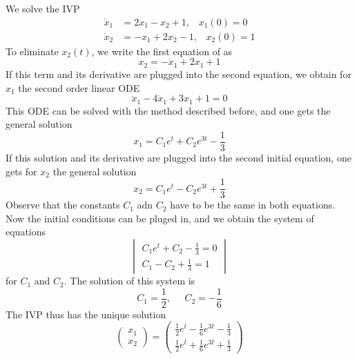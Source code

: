 We solve the IVP
\begin{equation}
  \begin{split}
    \dot{x}_1 &= 2x_1 - x_2 + 1, \;\;\; x_1(0) = 0\\
    \dot{x}_2 &= -x_1 + 2x_2 - 1, \;\;\; x_2(0) = 1
  \end{split}
\end{equation}
To eliminate $x_2(t)$, we write the first equation of as
\begin{equation}
  x_2 = -\dot{x}_1 + 2x_1 + 1
\end{equation}
If this term and its derivative are plugged into the second equation, we obtain for $x_1$ the second order linear ODE
\begin{equation}
  \ddot{x}_1 -4\dot{x}_1 + 3x_1 + 1 = 0
\end{equation}
This ODE can be solved with the method described before, and one gets the general solution
\begin{equation}
  x_1 = C_1 e^t + C_2 e^{3t} - \frac{1}{3}
\end{equation}
If this solution and its derivative are plugged into the second initial equation, one gets for $x_2$ the general solution
\begin{equation}
  x_2 = C_1 e^t - C_2 e^{3t} + \frac{1}{3}
\end{equation}
Observe that the constants $C_1$ adn $C_2$ have to be the same in both equations. Now the initial conditions can be pluged in, and we obtain the system of equations
\begin{equation}
  \begin{vmatrix}
    C_1 e^t + C_2 - \frac{1}{3} = 0\\
    C_1 - C_2 + \frac{1}{3} = 1
  \end{vmatrix}
\end{equation}
for $C_1$ and $C_2$. The solution of this system is
\begin{equation}
  C_1 = \frac{1}{2}, \;\;\;\;\; C_2 = -\frac{1}{6}
\end{equation}
The IVP thus has the unique solution
\begin{equation}
  \begin{pmatrix} x_1 \\ x_2 \end{pmatrix} =
  \begin{pmatrix}
    \frac{1}{2}e^t - \frac{1}{6}e^{3t} - \frac{1}{3}\\
    \frac{1}{2}e^t + \frac{1}{6}e^{3t} + \frac{1}{3}
  \end{pmatrix}
\end{equation}


